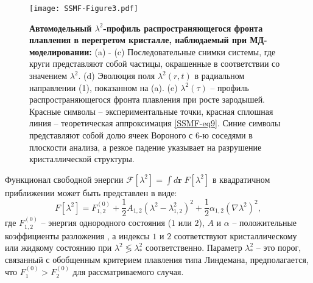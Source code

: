 \begin{figure*}[!t]
\centering
  \texttt{[image: SSMF-Figure3.pdf]}
  \caption{\textbf{Автомодельный $ \lambda^2$-профиль распространяющегося фронта плавления в перегретом кристалле, наблюдаемый при МД-моделировании:}
  (a) - (c) Последовательные снимки системы, где круги представляют собой частицы, окрашенные в соответствии со значением $\lambda^2$.
  (d) Эволюция поля $\lambda^2(r, t)$ в радиальном направлении (1), показанном на (a).
  (e) $\lambda^2(\tau)$ -- профиль распространяющегося фронта плавления при росте зародышей.
  Красные символы -- экспериментальные точки, красная сплошная линия -- теоретическая аппроксимация \eqref{SSMF-eq9}.
  Синие символы представляют собой долю ячеек Вороного с 6-ю соседями в плоскости анализа, а резкое падение указывает на разрушение кристаллической структуры.}
\label{SSMF-Figure3}
\end{figure*}

Функционал свободной энергии $\mathcal{F}[\lambda^2] = \int{d\mathbf{r}\;F[\lambda^2]}$ в квадратичном приближении может быть представлен в виде:
\begin{equation}
\label{SSMF-eq5}
F[\lambda^2] = F_{\mathrm{1,2}}^{(0)}+\frac{1}{2}A_{1,2}\left(\lambda^2-\lambda_{1,2}^2\right)^2 + \frac{1}{2}\alpha_{1,2}\left(\nabla\lambda^2\right)^2,
\end{equation}
где $F_{1,2}^{(0)}$ -- энергия однородного состояния ($1$ или $2$), $A$ и $\alpha$ -- положительные коэффициенты разложения \cite{book.desai}, а индексы $ 1 $ и $ 2 $ соответствуют кристаллическому или жидкому состоянию при $\lambda^2 \lessgtr \lambda_\ast^2$ соответственно.
Параметр $\lambda_\ast^2 $ -- это порог, связанный с обобщенным критерием плавления типа Линдемана, предполагается, что $ F_{\mathrm{1}} ^ {(0)}> F_{\mathrm{2}} ^ {(0)}$ для рассматриваемого случая.

